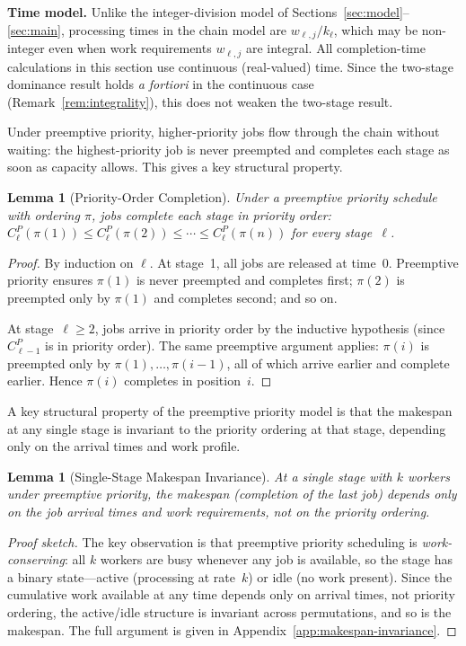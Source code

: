 \documentclass[11pt,titlepage]{article}
\newtheorem{lemma}[theorem]{Lemma}
\begin{document}
\noindent\textbf{Time model.}
Unlike the integer-division model of
Sections~\ref{sec:model}--\ref{sec:main}, processing times
in the chain model are $w_{\ell,j}/k_\ell$, which may be
non-integer even when work requirements $w_{\ell,j}$ are
integral.  All completion-time calculations in this section
use continuous (real-valued) time. Since the two-stage
dominance result holds \emph{a fortiori} in the continuous
case (Remark~\ref{rem:integrality}), this does not weaken
the two-stage result.

Under preemptive priority, higher-priority jobs flow through
the chain without waiting: the highest-priority job is never
preempted and completes each stage as soon as capacity allows.
This gives a key structural property.

\begin{lemma}[Priority-Order Completion]
\label{lem:priority-order}
Under a preemptive priority schedule with ordering $\pi$,
jobs complete each stage in priority order:
$C_\ell^P(\pi(1)) \leq C_\ell^P(\pi(2)) \leq \cdots
\leq C_\ell^P(\pi(n))$ for every stage~$\ell$.
\end{lemma}

\begin{proof}
By induction on $\ell$. At stage~1, all jobs are released at
time~0. Preemptive priority ensures $\pi(1)$ is never
preempted and completes first; $\pi(2)$ is preempted only by
$\pi(1)$ and completes second; and so on.

At stage~$\ell \geq 2$, jobs arrive in priority order by the
inductive hypothesis (since $C_{\ell-1}^P$ is in priority
order). The same preemptive argument applies: $\pi(i)$ is
preempted only by $\pi(1), \ldots, \pi(i{-}1)$, all of which
arrive earlier and complete earlier. Hence $\pi(i)$ completes
in position~$i$.
\end{proof}

A key structural property of the preemptive priority model
is that the makespan at any single stage is invariant to the
priority ordering at that stage, depending only on the
arrival times and work profile.

\begin{lemma}[Single-Stage Makespan Invariance]
\label{lem:makespan-invariance}
At a single stage with $k$ workers under preemptive priority,
the makespan (completion of the last job) depends only on
the job arrival times and work requirements, not on the
priority ordering.
\end{lemma}

\begin{proof}[Proof sketch]
The key observation is that preemptive priority scheduling is
\emph{work-conserving}: all $k$ workers are busy whenever any
job is available, so the stage has a binary state---active
(processing at rate~$k$) or idle (no work present). Since the
cumulative work available at any time depends only on arrival
times, not priority ordering, the active/idle structure is
invariant across permutations, and so is the makespan. The
full argument is given in Appendix~\ref{app:makespan-invariance}.
\end{proof}
\end{document}
